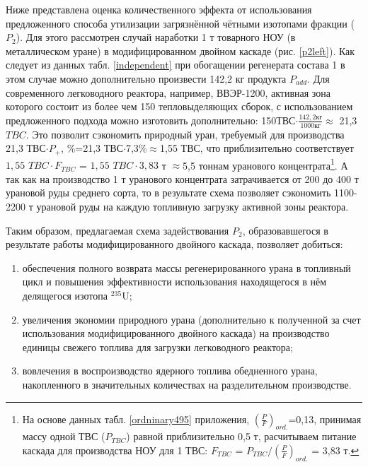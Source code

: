 Ниже представлена оценка количественного эффекта от использования предложенного способа утилизации загрязнённой чётными изотопами фракции ($P_2$). Для этого рассмотрен случай наработки 1 т товарного НОУ (в металлическом уране) в модифицированном двойном каскаде (рис. \ref{p2left}). Как следует из данных табл. \ref{independent} при обогащении регенерата состава 1 в этом случае можно дополнительно произвести 142,2 кг продукта $P_{add}$. Для современного легководного реактора, например, ВВЭР-1200, активная зона которого состоит из более чем 150 тепловыделяющих сборок, с использованием предложенного подхода можно изготовить дополнительно: 150$ $ТВС$\cdot \frac{142,2 \textit{кг}}{1000 \textit{кг}}\approx$ 21,3 $TBC$. Это позволит сэкономить природный уран, требуемый для производства 21,3 ТВС$\cdot P_{+}$, \%=21,3 ТВС$\cdot$7,3\%$\approx$1,55 ТВС, что приблизительно соответствует $1,55$  $TBC \cdot F_{TBC}$ = $1,55$ $TBC\cdot 3,83$ т $\approx$5,5 тоннам уранового концентрата\footnote{На основе данных табл. \ref{ordninary495} приложения, $(\frac{P}{F})_{ord.}$=0,13,  принимая массу одной ТВС ($P_{TBC}$) равной приблизительно 0,5 т, расчитываем питание каскада для производства НОУ для 1 ТВС: $F_{TBC}$ = $P_{TBC}/(\frac{P}{F})_{ord.}$ = 3,83 т.}. А так как на производство 1 т уранового концентрата затрачивается от 200 до 400 т урановой руды \cite{bekmanYaDERNAYaFIZIKA} среднего сорта, то в результате схема позволяет сэкономить 1100-2200 т урановой руды на каждую топливную загрузку активной зоны реактора.


Таким образом, предлагаемая схема задействования $P_2$, образовавшегося в результате работы модифицированного двойного каскада, позволяет добиться:
\begin{enumerate}
  \item обеспечения полного возврата массы регенерированного урана в топливный цикл и повышения эффективности использования находящегося в нём делящегося изотопа $^{235}$U;
  \item увеличения экономии природного урана (дополнительно к полученной за счет использования модифицированного двойного каскада)  на производство единицы свежего топлива для загрузки легководного реактора;
  \item вовлечения в воспроизводство ядерного топлива обедненного урана, накопленного в значительных количествах на разделительном производстве.
\end{enumerate}

